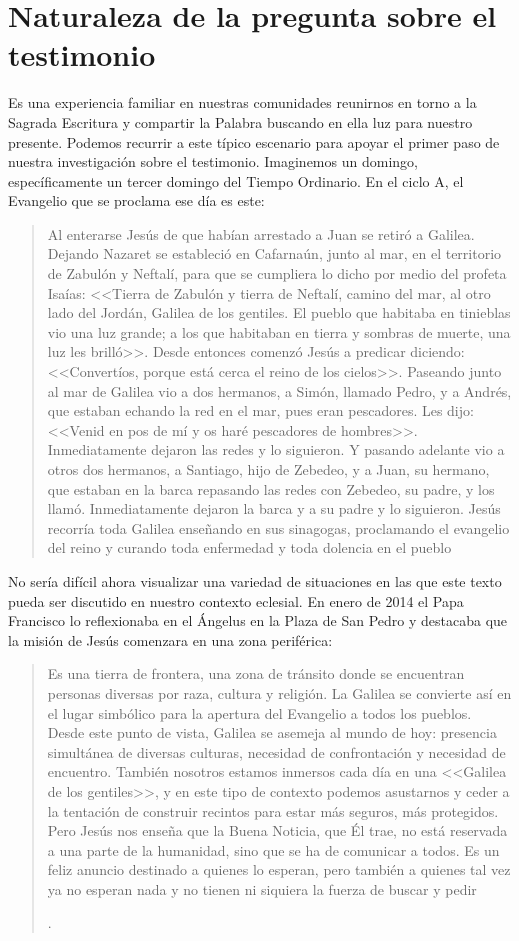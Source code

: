 \section{Naturaleza de la pregunta sobre el testimonio}

Es una experiencia familiar en nuestras comunidades reunirnos en torno a la Sagrada Escritura y compartir la Palabra buscando en ella luz para nuestro presente. Podemos recurrir a este típico escenario para apoyar el primer paso de nuestra investigación sobre el testimonio. Imaginemos un domingo, específicamente un tercer domingo del Tiempo Ordinario. En el ciclo A, el Evangelio que se proclama ese día es este:
\blockquote[][\,(Mt~4,12-23)]{Al enterarse Jesús de que habían arrestado a Juan se retiró a Galilea. Dejando Nazaret se estableció en Cafarnaún, junto al mar, en el territorio de Zabulón y Neftalí, para que se cumpliera lo dicho por medio del profeta Isaías: <<Tierra de Zabulón y tierra de Neftalí, camino del mar, al otro lado del Jordán, Galilea de los gentiles. El pueblo que habitaba en tinieblas vio una luz grande; a los que habitaban en tierra y sombras de muerte, una luz les brilló>>. Desde entonces comenzó Jesús a predicar diciendo: <<Convertíos, porque está cerca el reino de los cielos>>. Paseando junto al mar de Galilea vio a dos hermanos, a Simón, llamado Pedro, y a Andrés, que estaban echando la red en el mar, pues eran pescadores. Les dijo: <<Venid en pos de mí y os haré pescadores de hombres>>. Inmediatamente dejaron las redes y lo siguieron. Y pasando adelante vio a otros dos hermanos, a Santiago, hijo de Zebedeo, y a Juan, su hermano, que estaban en la barca repasando las redes con Zebedeo, su padre, y los llamó. Inmediatamente dejaron la barca y a su padre y lo siguieron. Jesús recorría toda Galilea enseñando en sus sinagogas, proclamando el evangelio del reino y curando toda enfermedad y toda dolencia en el pueblo}.

No sería difícil ahora visualizar una variedad de situaciones en las que este texto pueda ser discutido en nuestro contexto eclesial. En enero de 2014 el Papa Francisco lo reflexionaba en el Ángelus en la Plaza de San Pedro y destacaba que la misión de Jesús comenzara en una zona periférica:
\blockquote[{\Cite{francisco2014angelus}}.]{Es una tierra de frontera, una zona de tránsito donde se encuentran personas diversas por raza, cultura y religión. La Galilea se convierte así en el lugar simbólico para la apertura del Evangelio a todos los pueblos. Desde este punto de vista, Galilea se asemeja al mundo de hoy: presencia simultánea de diversas culturas, necesidad de confrontación y necesidad de encuentro. También nosotros estamos inmersos cada día en una <<Galilea de los gentiles>>, y en este tipo de contexto podemos asustarnos y ceder a la tentación de construir recintos para estar más seguros, más protegidos. Pero Jesús nos enseña que la Buena Noticia, que Él trae, no está reservada a una parte de la humanidad, sino que se ha de comunicar a todos. Es un feliz anuncio destinado a quienes lo esperan, pero también a quienes tal vez ya no esperan nada y no tienen ni siquiera la fuerza de buscar y pedir}.

